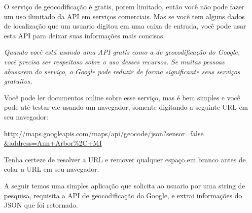 O serviço de geocodificação é gratis, porem limitado, então você não pode fazer
um uso ilimitado da API em serviços comerciais. Mas se você tem alguns dados de
localização que um usuario digitou em uma caixa de entrada, você pode usar
esta API para deixar suas informações mais concisas.

{\em Quando você está usando uma API gratis como a de geocodificação do Google,
você precisa ser respeitoso sobre o uso desses recursos. Se muitas pessoas
abusarem do serviço, o Google pode reduzir de forma significante seus serviços
gratuitos.}

Você pode ler documentos online sobre esse serviço, mas é bem simples e você
pode até testar ele usando um navegador, somente digitando a seguinte URL em
seu navegador:

\url{http://maps.googleapis.com/maps/api/geocode/json?sensor=false &address=Ann+Arbor%2C+MI}

Tenha certeze de resolver a URL e remover qualquer espaço em branco antes de 
colar a URL em seu navegador.

A seguir temos uma simples aplicação que solicita ao usuario por uma string de
pesquisa, requisita a API de geocodificação do Google, e extrai informações do
JSON que foi retornado.

